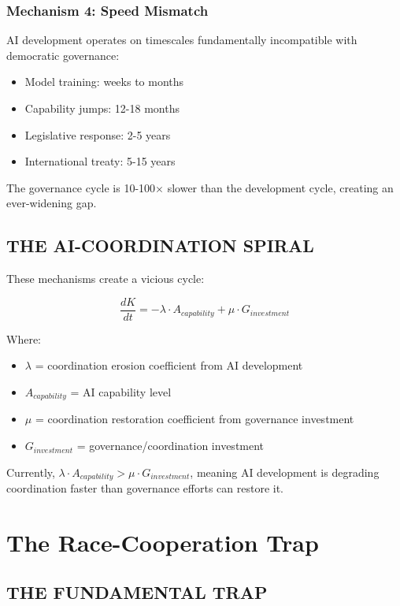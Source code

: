 \documentclass[11pt,letterpaper]{article}
\newcommand{\kindex}{K}
\begin{document}
\subsubsection{Mechanism 4: Speed Mismatch}

AI development operates on timescales fundamentally incompatible with democratic governance:
\begin{itemize}
\item Model training: weeks to months
\item Capability jumps: 12-18 months
\item Legislative response: 2-5 years
\item International treaty: 5-15 years
\end{itemize}

The governance cycle is 10-100$\times$ slower than the development cycle, creating an ever-widening gap.

\subsection{THE AI-COORDINATION SPIRAL}

These mechanisms create a vicious cycle:

\begin{equation}
\frac{d\kindex}{dt} = -\lambda \cdot A_{capability} + \mu \cdot G_{investment}
\label{eq:spiral}
\end{equation}

Where:
\begin{itemize}
\item $\lambda$ = coordination erosion coefficient from AI development
\item $A_{capability}$ = AI capability level
\item $\mu$ = coordination restoration coefficient from governance investment
\item $G_{investment}$ = governance/coordination investment
\end{itemize}

Currently, $\lambda \cdot A_{capability} > \mu \cdot G_{investment}$, meaning AI development is degrading coordination faster than governance efforts can restore it.

\section{The Race-Cooperation Trap}

\subsection{THE FUNDAMENTAL TRAP}
\end{document}
